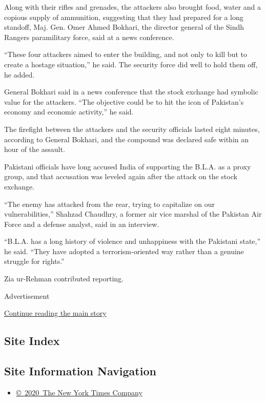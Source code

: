Along with their rifles and grenades, the attackers also brought food,
water and a copious supply of ammunition, suggesting that they had
prepared for a long standoff, Maj. Gen. Omer Ahmed Bokhari, the director
general of the Sindh Rangers paramilitary force, said at a news
conference.

``These four attackers aimed to enter the building, and not only to kill
but to create a hostage situation,'' he said. The security force did
well to hold them off, he added.

General Bokhari said in a news conference that the stock exchange had
symbolic value for the attackers. ``The objective could be to hit the
icon of Pakistan's economy and economic activity,'' he said.

The firefight between the attackers and the security officials lasted
eight minutes, according to General Bokhari, and the compound was
declared safe within an hour of the assault.

Pakistani officials have long accused India of supporting the B.L.A. as
a proxy group, and that accusation was leveled again after the attack on
the stock exchange.

``The enemy has attacked from the rear, trying to capitalize on our
vulnerabilities,'' Shahzad Chaudhry, a former air vice marshal of the
Pakistan Air Force and a defense analyst, said in an interview.

``B.L.A. has a long history of violence and unhappiness with the
Pakistani state,'' he said. ``They have adopted a terrorism-oriented way
rather than a genuine struggle for rights.''

Zia ur-Rehman contributed reporting.

Advertisement

\protect\hyperlink{after-bottom}{Continue reading the main story}

\hypertarget{site-index}{%
\subsection{Site Index}\label{site-index}}

\hypertarget{site-information-navigation}{%
\subsection{Site Information
Navigation}\label{site-information-navigation}}

\begin{itemize}
\tightlist
\item
  \href{https://help.nytimes3xbfgragh.onion/hc/en-us/articles/115014792127-Copyright-notice}{©~2020~The
  New York Times Company}
\end{itemize}


